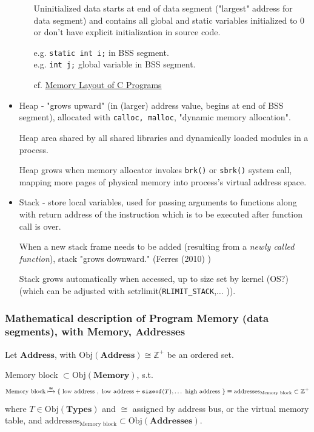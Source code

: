 \documentclass[10pt]{amsart}
\begin{document}
\begin{itemize}
\begin{itemize}
		Uninitialized data starts at end of data segment ("largest" address for data segment) and contains all global and static variables initialized to 0 or don't have explicit initialization in source code.  
		
		e.g. \verb|static int i;| in BSS segment.  \\
		e.g. \verb|int j;| global variable in BSS segment. 	
		
		cf. \href{http://www.geeksforgeeks.org/memory-layout-of-c-program/}{Memory Layout of C Programs}  
		
	\end{itemize}
	\item Heap - "grows upward" (in (larger) address value, begins at end of BSS segment), allocated with \verb|calloc, malloc|, "dynamic memory allocation".    
	
	Heap area shared by all shared libraries and dynamically loaded modules in a process.  
	
	Heap grows when memory allocator invokes \verb|brk()| or \verb|sbrk()| system call, mapping more pages of physical memory into process's virtual address space.  
	
	\item Stack - store local variables, used for passing arguments to functions along with return address of the instruction which is to be executed after function call is over.  
	
	When a new stack frame needs to be added (resulting from a \emph{newly called function}), stack "grows downward."  (Ferres (2010) \cite{Ferr2010})  
	
	Stack grows automatically when accessed, up to size set by kernel (OS?) (which can be adjusted with setrlimit(\verb|RLIMIT_STACK|,$\ldots$ )).  \\
\end{itemize}

\subsubsection{Mathematical description of Program Memory (data segments), with \textbf{Memory}, \textbf{Addresses}}  

Let $\textbf{Address}$, with $\text{Obj}{(\textbf{Address})} \cong \mathbb{Z}^+$ be an ordered set.  

Memory block $\subset \text{Obj}{(\textbf{Memory})}$, s.t. 
\[
\text{Memory block} \xmapsto{ \cong } \lbrace \text{ low address }, \text{ low address} + \texttt{sizeof}(T) , \dots \text{ high address } \rbrace  \equiv \text{addresses}_{\text{Memory block} } \subset \mathbb{Z}^+
\]
where $T \in \text{Obj}{(\textbf{Types})}$ and $\cong$ assigned by address bus, or the virtual memory table, and $\text{addresses}_{\text{Memory block}} \subset \text{Obj}{(\textbf{Addresses})}$.  
\end{document}
